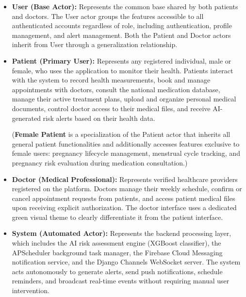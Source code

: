 \begin{itemize}
    \item \textbf{User (Base Actor):} Represents the common base shared by both patients
    and doctors. The User actor groups the features accessible to all authenticated
    accounts regardless of role, including authentication, profile management, and
    alert management. Both the Patient and Doctor actors inherit from User through
    a generalization relationship.

    \item \textbf{Patient (Primary User):} Represents any registered individual, male or
        female, who uses the application to monitor their health. Patients interact with the
        system to record health measurements, book and manage appointments with doctors,
        consult the national medication database, manage their active treatment plans,
        upload and organize personal medical documents, control doctor access to their
        medical files, and receive AI-generated risk alerts based on their health data.

            (\textbf{Female Patient} is a specialization of the Patient actor that inherits all
    general patient functionalities and additionally accesses features exclusive to female
    users: pregnancy lifecycle management, menstrual cycle tracking, and pregnancy risk
    evaluation during medication consultation.)


    \item \textbf{Doctor (Medical Professional):} Represents verified healthcare providers
    registered on the platform. Doctors manage their weekly schedule, confirm or cancel
    appointment requests from patients, and access patient medical files upon receiving
    explicit authorization. The doctor interface uses a dedicated green visual theme to
    clearly differentiate it from the patient interface.

    \item \textbf{System (Automated Actor):} Represents the backend processing layer,
    which includes the AI risk assessment engine (XGBoost classifier), the APScheduler
    background task manager, the Firebase Cloud Messaging notification service, and the
    Django Channels WebSocket server. The system acts autonomously to generate
    alerts, send push notifications, schedule reminders, and broadcast real-time events
    without requiring manual user intervention.
\end{itemize}

